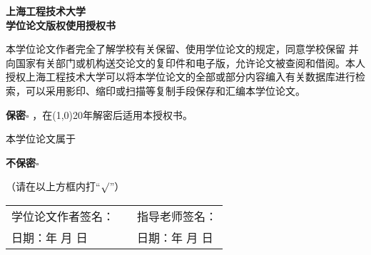 \begin{center}
    \heiti\sanhao\textbf{
    上海工程技术大学 \\
    学位论文版权使用授权书}
\end{center}

本学位论文作者完全了解学校有关保留、使用学位论文的规定，同意学校保留
并向国家有关部门或机构送交论文的复印件和电子版，允许论文被查阅和借阅。本人
授权上海工程技术大学可以将本学位论文的全部或部分内容编入有关数据库进行检
索，可以采用影印、缩印或扫描等复制手段保存和汇编本学位论文。

\hspace{8em}\textbf{保密}$\square$ ，在\line(1,0){20}年解密后适用本授权书。

本学位论文属于\hspace{5em}

\hspace{8em}\textbf{不保密}$\square$ 

（请在以上方框内打\quad “\emph{$\surd$}”）

\vspace{15em}
\begin{table}[hbpt]
    \centering
    \renewcommand\arraystretch{1.8}
    \begin{tabular}{p{6cm}<{\raggedright}p{2cm}<{\centering}p{6cm}<{\raggedright}}
        学位论文作者签名：& & 指导老师签名： \\
        日期：\qquad 年 \qquad 月 \qquad 日 & & 日期：\qquad 年 \qquad 月 \qquad 日
    \end{tabular}
\end{table}
\newpage

